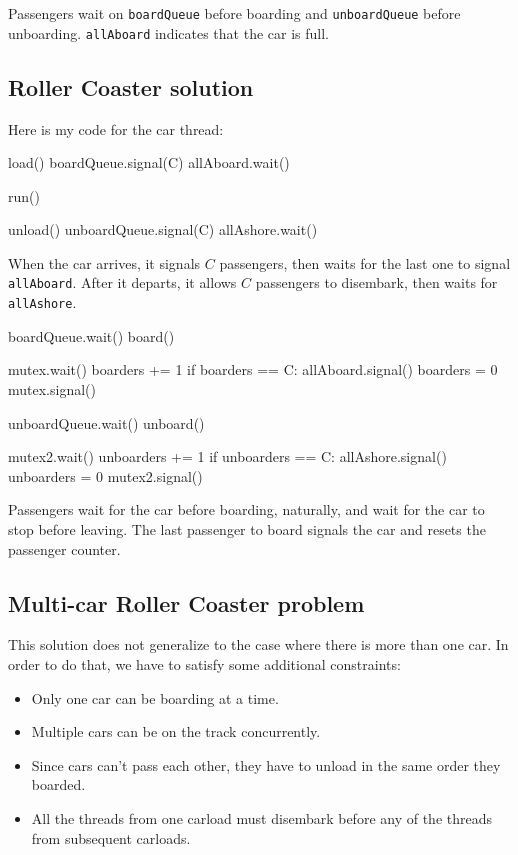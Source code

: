 \documentclass{book}
\begin{document}
Passengers wait on {\tt boardQueue} before boarding and
    {\tt unboardQueue} before unboarding.  {\tt allAboard}
indicates that the car is full.



\subsection{Roller Coaster solution}

Here is my code for the car thread:

\begin{unbreakable}[title={Roller Coaster solution (car)}]{}
load()
boardQueue.signal(C)
allAboard.wait()

run()

unload()
unboardQueue.signal(C)
allAshore.wait()
\end{unbreakable}

When the car arrives, it signals $C$ passengers,
then waits for the last one to signal {\tt allAboard}.
After it departs, it allows $C$ passengers to disembark,
then waits for {\tt allAshore}.


\begin{unbreakable}[title={Roller Coaster solution (passenger)}]{}
boardQueue.wait()
board()

mutex.wait()
   boarders += 1
   if boarders == C:
       allAboard.signal()
       boarders = 0
mutex.signal()

unboardQueue.wait()
unboard()

mutex2.wait()
   unboarders += 1
   if unboarders == C:
       allAshore.signal()
       unboarders = 0
mutex2.signal()
\end{unbreakable}

Passengers wait for the car before boarding, naturally, and wait for
the car to stop before leaving.  The last passenger to board signals
the car and resets the passenger counter.



\subsection{Multi-car Roller Coaster problem}

This solution does not generalize to the case where there is more
than one car.  In order to do that, we have to satisfy some additional
constraints:

\begin{itemize}
    \item Only one car can be boarding at a time.
    \item Multiple cars can be on the track concurrently.
    \item Since cars can't pass each other, they have to unload
          in the same order they boarded.
    \item All the threads from one carload must disembark before
          any of the threads from subsequent carloads.

\end{itemize}
\end{document}
